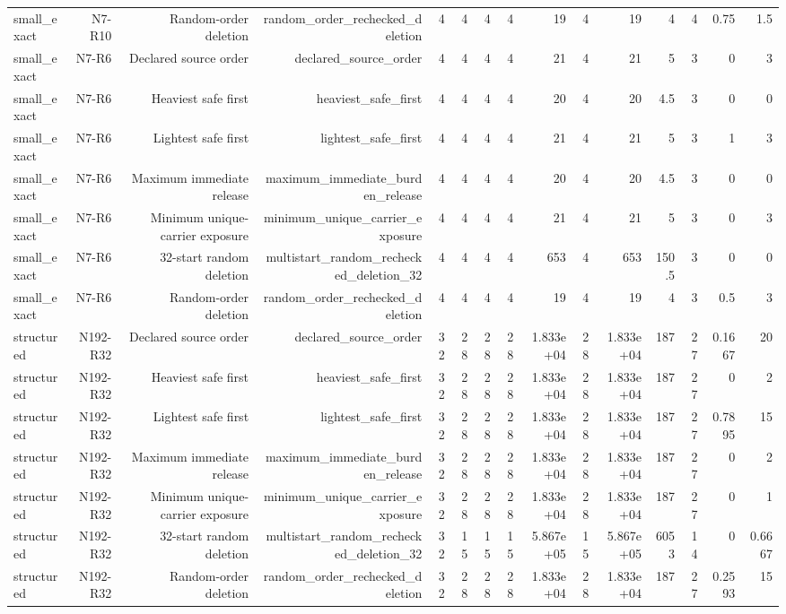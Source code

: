 {\begin{longtable}{lrrrrrrrrrrrrrr}
small\_exact & N7-R10 & Random-order deletion & random\_order\_rechecked\_deletion & 4 & 4 & 4 & 4 & 19 & 4 & 19 & 4 & 4 & 0.75 & 1.5 \\
small\_exact & N7-R6 & Declared source order & declared\_source\_order & 4 & 4 & 4 & 4 & 21 & 4 & 21 & 5 & 3 & 0 & 3 \\
small\_exact & N7-R6 & Heaviest safe first & heaviest\_safe\_first & 4 & 4 & 4 & 4 & 20 & 4 & 20 & 4.5 & 3 & 0 & 0 \\
small\_exact & N7-R6 & Lightest safe first & lightest\_safe\_first & 4 & 4 & 4 & 4 & 21 & 4 & 21 & 5 & 3 & 1 & 3 \\
small\_exact & N7-R6 & Maximum immediate release & maximum\_immediate\_burden\_release & 4 & 4 & 4 & 4 & 20 & 4 & 20 & 4.5 & 3 & 0 & 0 \\
small\_exact & N7-R6 & Minimum unique-carrier exposure & minimum\_unique\_carrier\_exposure & 4 & 4 & 4 & 4 & 21 & 4 & 21 & 5 & 3 & 0 & 3 \\
small\_exact & N7-R6 & 32-start random deletion & multistart\_random\_rechecked\_deletion\_32 & 4 & 4 & 4 & 4 & 653 & 4 & 653 & 150.5 & 3 & 0 & 0 \\
small\_exact & N7-R6 & Random-order deletion & random\_order\_rechecked\_deletion & 4 & 4 & 4 & 4 & 19 & 4 & 19 & 4 & 3 & 0.5 & 3 \\
structured & N192-R32 & Declared source order & declared\_source\_order & 32 & 28 & 28 & 28 & 1.833e+04 & 28 & 1.833e+04 & 187 & 27 & 0.1667 & 20 \\
structured & N192-R32 & Heaviest safe first & heaviest\_safe\_first & 32 & 28 & 28 & 28 & 1.833e+04 & 28 & 1.833e+04 & 187 & 27 & 0 & 2 \\
structured & N192-R32 & Lightest safe first & lightest\_safe\_first & 32 & 28 & 28 & 28 & 1.833e+04 & 28 & 1.833e+04 & 187 & 27 & 0.7895 & 15 \\
structured & N192-R32 & Maximum immediate release & maximum\_immediate\_burden\_release & 32 & 28 & 28 & 28 & 1.833e+04 & 28 & 1.833e+04 & 187 & 27 & 0 & 2 \\
structured & N192-R32 & Minimum unique-carrier exposure & minimum\_unique\_carrier\_exposure & 32 & 28 & 28 & 28 & 1.833e+04 & 28 & 1.833e+04 & 187 & 27 & 0 & 1 \\
structured & N192-R32 & 32-start random deletion & multistart\_random\_rechecked\_deletion\_32 & 32 & 15 & 15 & 15 & 5.867e+05 & 15 & 5.867e+05 & 6053 & 14 & 0 & 0.6667 \\
structured & N192-R32 & Random-order deletion & random\_order\_rechecked\_deletion & 32 & 28 & 28 & 28 & 1.833e+04 & 28 & 1.833e+04 & 187 & 27 & 0.2593 & 15 \\

\end{longtable}}
